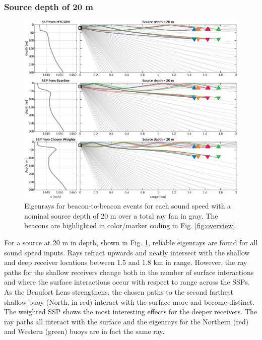 \subsubsection{Source depth of 20 m}
\begin{figure}[ht!]
  \centering
  \includegraphics[width=\reprintcolumnwidth]{figs/raytrace-3env-zs-20.pdf}
  \caption{Eigenrays for beacon-to-beacon events for each sound speed with a nominal source depth of 20 m over a total ray fan in gray. The beacons are highlighted in color/marker coding in Fig. \ref{fig:overview}.}
  \label{fig:raytrace-zs20}
\end{figure}

For a source at 20 m in depth, shown in Fig. \ref{fig:raytrace-zs20}, reliable eigenrays are found for all sound speed inputs.
Rays refract upwards and neatly intersect with the shallow and deep receiver locations between 1.5 and 1.8 km in range.
However, the ray paths for the shallow receivers change both in the number of surface interactions and where the surface interactions occur with respect to range across the SSPs.
As the Beaufort Lens strengthens, the chosen paths to the second farthest shallow buoy (North, in red) interact with the surface more and become distinct.
The weighted SSP shows the most interesting effects for the deeper receivers.
The ray paths all interact with the surface and the eigenrays for the Northern (red) and Western (green) buoys are in fact the same ray.

